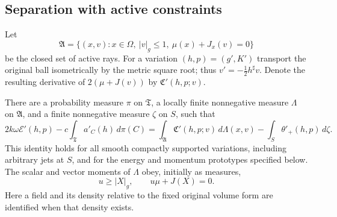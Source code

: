 \subsection{Separation with active constraints}

Let
\[
 \mathfrak A=\{(x,v):x\in\Omega,\ |v|_g\le1,\ \mu(x)+J_x(v)=0\}
\]
be the closed set of active rays.  For a variation $(h,p)=(g',K')$
transport the original ball isometrically by the metric square root;
thus $v'=-\tfrac12h^\sharp v$.  Denote the resulting derivative of
$2(\mu+J(v))$ by $\mathfrak C'(h,p;v)$.

\begin{proposition}
\label{prop:variation:multiplier}
There are a probability measure $\pi$ on $\mathfrak T$, a locally finite
nonnegative measure $\Lambda$ on $\mathfrak A$, and a finite nonnegative
measure $\zeta$ on $S$, such that
\begin{equation}\label{eq:variation:multiplier}
 2k\omega\mathcal E'(h,p)-c\int_{\mathfrak T}a'_C(h)\,d\pi(C)
 =\int_{\mathfrak A}\mathfrak C'(h,p;v)\,d\Lambda(x,v)
       -\int_S\theta'_+(h,p)\,d\zeta.
\end{equation}
This identity holds for all smooth compactly supported variations,
including arbitrary jets at $S$, and for the energy and momentum
prototypes specified below.  The scalar and vector moments of $\Lambda$
obey, initially as measures,
\begin{equation}\label{eq:variation:causality}
 u\ge |X|_g,\qquad u\mu+J(X)=0.
\end{equation}
Here a field and its density relative to the fixed original volume
form are identified when that density exists.
\end{proposition}

